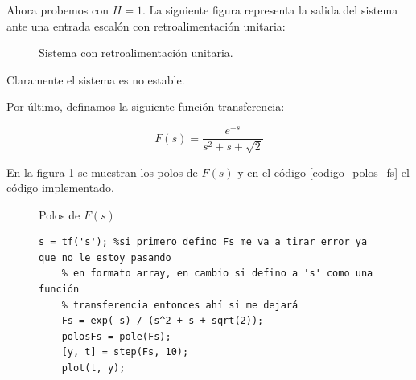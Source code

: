 \documentclass[twoside]{article}
\begin{document}
\newpage

Ahora probemos con $H = 1$. La siguiente figura representa la salida del sistema ante una entrada escalón con retroalimentación unitaria:

\begin{figure}[ht!]
    \centering
    \caption{Sistema con retroalimentación unitaria.}
\end{figure}


\noindent Claramente el sistema es no estable.

\vspace{0.5cm}

Por último, definamos la siguiente función transferencia:

\begin{equation}
   F(s) = \frac{e^{-s}}{s^2 + s + \sqrt{2}}
\end{equation}


\noindent En la figura \ref{polos:fs} se muestran los polos de $F(s)$ y en el código \ref{codigo_polos_fs} el código implementado.


\begin{figure}[ht!]
    \centering
    \caption{Polos de $F(s)$}
    \label{polos:fs}
\end{figure}



\begin{figure}[ht!]
    \begin{lstlisting}[caption={Cálculo de los polos de la función $F(s)$}, label={codigo_polos_fs}]
    s = tf('s'); %si primero defino Fs me va a tirar error ya que no le estoy pasando
    % en formato array, en cambio si defino a 's' como una función
    % transferencia entonces ahí si me dejará
    Fs = exp(-s) / (s^2 + s + sqrt(2)); 
    polosFs = pole(Fs);
    [y, t] = step(Fs, 10);
    plot(t, y);
    \end{lstlisting}
\end{figure}
\end{document}

